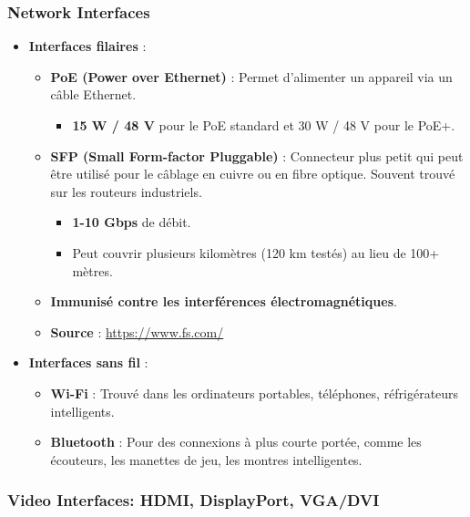 \documentclass[10pt,a4paper]{article}
\begin{document}
\subsubsection*{Network Interfaces}
\begin{itemize}
    \item \textbf{Interfaces filaires} :
    \begin{itemize}
        \item \textbf{PoE (Power over Ethernet)} : Permet d'alimenter un appareil via un câble Ethernet.
        \begin{itemize}
            \item \textbf{15 W / 48 V} pour le PoE standard et 30 W / 48 V pour le PoE+.
        \end{itemize}
        \item \textbf{SFP (Small Form-factor Pluggable)} : Connecteur plus petit qui peut être utilisé pour le câblage en cuivre ou en fibre optique. Souvent trouvé sur les routeurs industriels.
        \begin{itemize}
            \item \textbf{1-10 Gbps} de débit.
            \item Peut couvrir plusieurs kilomètres (120 km testés) au lieu de 100+ mètres.
        \end{itemize}
        \item \textbf{Immunisé contre les interférences électromagnétiques}.
    \end{itemize}
    \begin{itemize}
        \item \textbf{Source} : \url{https://www.fs.com/}
    \end{itemize}
    \item \textbf{Interfaces sans fil} :
    \begin{itemize}
        \item \textbf{Wi-Fi} : Trouvé dans les ordinateurs portables, téléphones, réfrigérateurs intelligents.
        \item \textbf{Bluetooth} : Pour des connexions à plus courte portée, comme les écouteurs, les manettes de jeu, les montres intelligentes.
    \end{itemize}
\end{itemize}

\subsubsection*{Video Interfaces: HDMI, DisplayPort, VGA/DVI}
\end{document}

